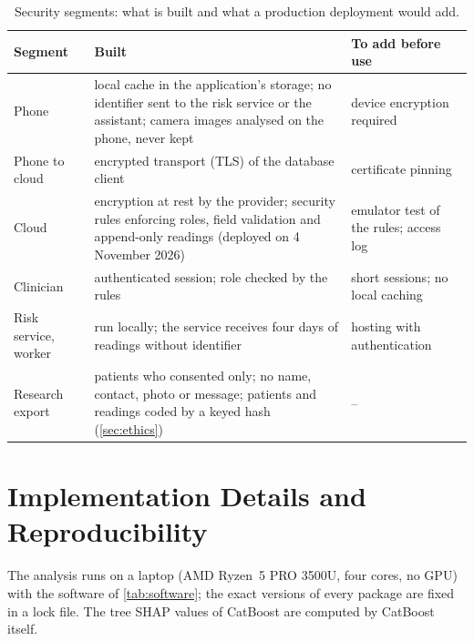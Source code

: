 \documentclass[11pt,a4paper,oneside]{report}
\makeatletter
\renewcommand\paragraph{\@startsection{paragraph}{4}{\z@}{1.5ex \@plus 0.5ex \@minus 0.2ex}{-1em}{\normalfont\normalsize\bfseries}}
\makeatother
\begin{document}
\begin{table}[htbp]
\centering\footnotesize
\caption{Security segments: what is built and what a production deployment would add.}\label{tab:security-segments}
\begin{tabularx}{\textwidth}{@{}>{\raggedright\arraybackslash}p{2.8cm} X >{\raggedright\arraybackslash}p{4.2cm}@{}}
\toprule
\textbf{Segment} & \textbf{Built} & \textbf{To add before use} \\
\midrule
Phone & local cache in the application's storage; no identifier sent to the risk service or the assistant; camera images analysed on the phone, never kept & device encryption required \\
Phone to cloud & encrypted transport (TLS) of the database client & certificate pinning \\
Cloud & encryption at rest by the provider; security rules enforcing roles, field validation and append-only readings (deployed on 4 November 2026) & emulator test of the rules; access log \\
Clinician & authenticated session; role checked by the rules & short sessions; no local caching \\
Risk service, worker & run locally; the service receives four days of readings without identifier & hosting with authentication \\
Research export & patients who consented only; no name, contact, photo or message; patients and readings coded by a keyed hash (\cref{sec:ethics}) & -- \\
\bottomrule
\end{tabularx}
\end{table}

\section{Implementation Details and Reproducibility}\label{sec:tools}

\paragraph{Environment} The analysis runs on a laptop (AMD Ryzen~5 PRO 3500U, four cores, no GPU) with the software of \cref{tab:software}; the exact versions of every package are fixed in a lock file. The tree SHAP values of CatBoost are computed by CatBoost itself.
\end{document}
